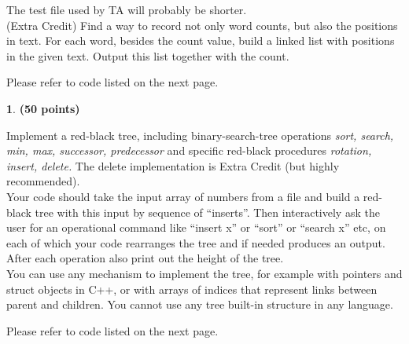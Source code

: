 \documentclass[11pt]{article}
\theoremstyle{definition}
\theoremstyle{theorem}
\newtheorem{prob}{}
\newcommand{\solution}{\medskip\noindent{\color{DarkBlue}\textbf{Solution:}}}
\begin{document}
\noindent The test file used by TA will probably be shorter.
\\

\noindent (Extra Credit) Find a way to record not only word counts, but also the positions in text.  For each word, besides the count value, build a linked list with positions in the given text.  Output this list together with the count.

\solution

Please refer to code listed on the next page.


\newpage
\begin{prob} \textbf{(50 points)}
\end{prob}

\noindent Implement  a  red-black  tree,  including  binary-search-tree  operations \textit{sort, search, min, max, successor, predecessor} and  specific  red-black  procedures \textit{rotation, insert, delete.}  The delete implementation is Extra Credit (but highly recommended).
\\

\noindent Your code should take the input array of numbers from a file and build a red-black tree with this input by sequence of “inserts”.  Then interactively ask the user for an operational command like “insert x” or “sort” or “search x” etc, on each of which your code rearranges the tree and if needed produces an output.  After each operation also print out the height of the tree.
\\

\noindent You  can  use  any  mechanism  to  implement  the  tree,  for  example  with  pointers  and struct objects in C++, or with arrays of indices that represent links between parent and children.  You cannot use any tree built-in structure in any language.

\solution

Please refer to code listed on the next page.
\end{document}
